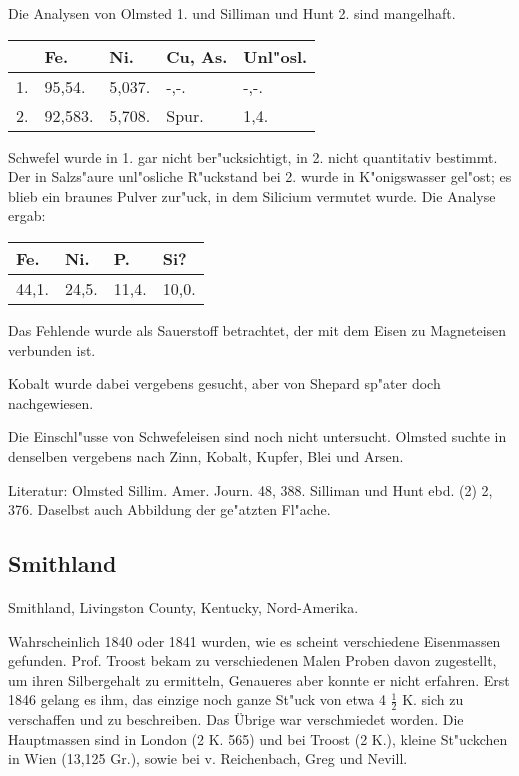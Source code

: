 \documentclass[a4paper, 11pt, oneside]{article}
\begin{document}
Die Analysen von Olmsted 1. und Silliman und Hunt 2. sind mangelhaft.
\begin{table}[H]
    \centering
    \begin{tabular}{l l l l l}
         & Fe. & Ni. & Cu, As. & Unl"osl. \\ \hline
        1. & 95,54. & 5,037. & -,-. & -,-. \\
        2. & 92,583. & 5,708. & Spur. & 1,4. \\
    \end{tabular}
\end{table}

Schwefel wurde in 1. gar nicht ber"ucksichtigt, in 2. nicht quantitativ bestimmt. Der in Salzs"aure unl"osliche R"uckstand bei 2. wurde in K"onigswasser gel"ost; es blieb ein braunes Pulver zur"uck, in dem Silicium vermutet wurde. Die Analyse ergab:
\begin{table}[H]
    \centering
    \begin{tabular}{l l l l}
        Fe. & Ni. & P. & Si? \\ \hline
        44,1. & 24,5. & 11,4. & 10,0. \\
    \end{tabular}
\end{table}

Das Fehlende wurde als Sauerstoff betrachtet, der mit dem Eisen zu Magneteisen verbunden ist.

Kobalt wurde dabei vergebens gesucht, aber von Shepard sp"ater doch nachgewiesen.

Die Einschl"usse von Schwefeleisen sind noch nicht untersucht. Olmsted suchte in denselben vergebens nach Zinn, Kobalt, Kupfer, Blei und Arsen.

\footnotesize
Literatur: Olmsted Sillim. Amer. Journ. 48, 388. Silliman und Hunt ebd. (2) 2, 376. Daselbst auch Abbildung der ge"atzten Fl"ache.

\subsection{Smithland}
\normalsize
\paragraph{}
Smithland, Livingston County, Kentucky, Nord-Amerika.

Wahrscheinlich 1840 oder 1841 wurden, wie es scheint verschiedene Eisenmassen gefunden. Prof. Troost bekam zu verschiedenen Malen Proben davon zugestellt, um ihren Silbergehalt zu ermitteln, Genaueres aber konnte er nicht erfahren. Erst 1846 gelang es ihm, das einzige noch ganze St"uck von etwa 4 $\frac{1}{2}$ K. sich zu verschaffen und zu beschreiben. Das Übrige war verschmiedet worden. Die Hauptmassen sind in London (2 K. 565) und bei Troost (2 K.), kleine St"uckchen in Wien (13,125 Gr.), sowie bei v. Reichenbach, Greg und Nevill.
\end{document}
